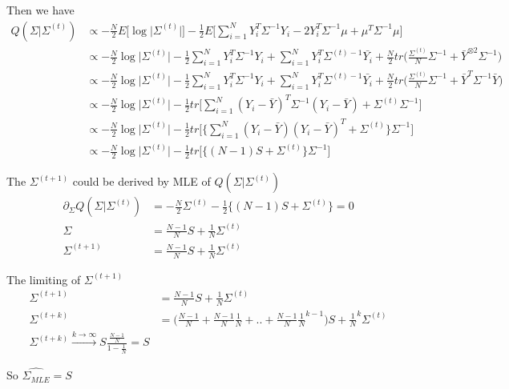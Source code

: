 \begin{itemize}
Then we have
\begin{align*}
Q(\Sigma | \Sigma^{(t)}) &  \propto - \frac{N}{2}E \Big[ \log  \vert \Sigma^{(t)} \vert \Big] - \frac{1}{2} E \Big[ \sum_{i=1}^N  Y_i^T \Sigma^{-1} Y_i - 2 Y_i^T  \Sigma^{-1}  \mu + \mu^T \Sigma^{-1} \mu \Big] \\
& \propto - \frac{N}{2} \log  \vert \Sigma^{(t)} \vert - \frac{1}{2} \sum_{i=1}^N  Y_i^T \Sigma^{-1} Y_i +  \sum_{i=1}^N Y_i^T  \Sigma^{(t)-1} \bar{Y_i} + \frac{N}{2} tr \Big( \frac{\Sigma^{(t)}}{N} \Sigma^{-1}  + \bar{Y}^{\otimes 2} \Sigma^{-1} \Big) \\
& \propto - \frac{N}{2}\log  \vert \Sigma^{(t)} \vert - \frac{1}{2} \sum_{i=1}^N  Y_i^T \Sigma^{-1} Y_i +  \sum_{i=1}^N Y_i^T  \Sigma^{(t) -1} \bar{Y_i} + \frac{N}{2} tr \Big( \frac{\Sigma^{(t)}}{N} \Sigma^{-1}  + \bar{Y}^{T} \Sigma^{-1} \bar{Y} \Big) \\
& \propto - \frac{N}{2} \log  \vert \Sigma^{(t)} \vert  - \frac{1}{2} tr \Big[ \sum_{i=1}^N (Y_i- \bar{Y})^T \Sigma^{-1} (Y_i - \bar{Y}) + \Sigma^{(t)} \Sigma^{-1}  \Big]\\
& \propto - \frac{N}{2} \log  \vert \Sigma^{(t)} \vert - \frac{1}{2} tr \Big[ \{ \sum_{i=1}^N (Y_i - \bar{Y})(Y_i- \bar{Y})^T + \Sigma^{(t)} \} \Sigma^{-1}  \Big]\\
& \propto - \frac{N}{2} \log  \vert \Sigma^{(t)} \vert - \frac{1}{2} tr \Big[ \{ (N-1)S + \Sigma^{(t)} \} \Sigma^{-1}  \Big]
\end{align*}

The $\Sigma^{(t+1)}$ could be derived by MLE of $Q(\Sigma | \Sigma^{(t)}) $
\begin{align*}
\partial_{\Sigma}Q(\Sigma | \Sigma^{(t)}) &= - \frac{N}{2}   \Sigma^{(t)}  - \frac{1}{2}  \{ (N-1)S + \Sigma^{(t)} \} = 0 \\
\Sigma &= \frac{N-1}{N} S + \frac{1}{N} \Sigma^{(t)} \\
\Sigma^{(t+1)} &= \frac{N-1}{N} S + \frac{1}{N} \Sigma^{(t)}
\end{align*}

The limiting of  $\Sigma^{(t+1)}$ 
\begin{align*}
\Sigma^{(t+1)} &= \frac{N-1}{N} S + \frac{1}{N} \Sigma^{(t)} \\
\Sigma^{(t+k)} &= \Big( \frac{N-1}{N} + \frac{N-1}{N} \frac{1}{N} + .. +  \frac{N-1}{N}  \frac{1}{N}^{k-1}  \Big) S + \frac{1}{N}^k \Sigma^{(t)} \\
\Sigma^{(t+k)} \xrightarrow{k \rightarrow \infty} S \frac{\frac{N-1}{N}}{1 - \frac{1}{N}} = S
\end{align*}

So $\hat{\Sigma_{MLE}} = S$
\end{itemize}

 

